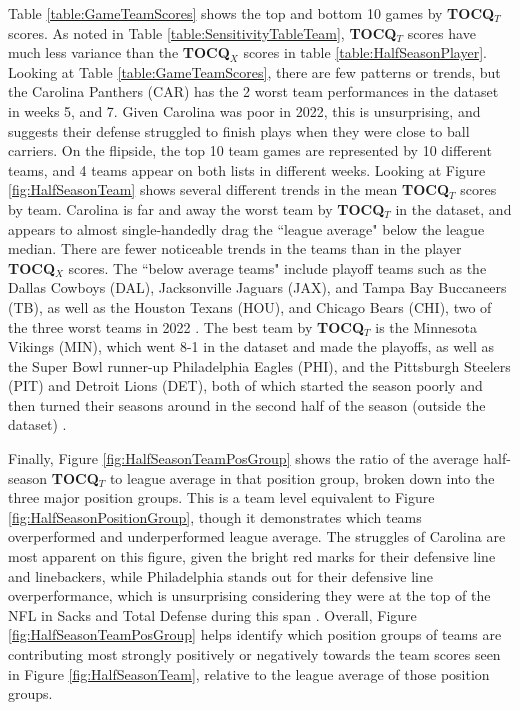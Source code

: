 \documentclass{article}
\begin{document}
Table \ref{table:GameTeamScores} shows the top and bottom 10 games by \textbf{TOCQ$_T$} scores. As noted in Table \ref{table:SensitivityTableTeam}, \textbf{TOCQ$_T$} scores have much less variance than the \textbf{TOCQ$_X$} scores in table \ref{table:HalfSeasonPlayer}. Looking at Table \ref{table:GameTeamScores}, there are few patterns or trends, but the Carolina Panthers (CAR) has the 2 worst team performances in the dataset in weeks 5, and 7. Given Carolina was poor in 2022, this is unsurprising, and suggests their defense struggled to finish plays when they were close to ball carriers. On the flipside, the top 10 team games are represented by 10 different teams, and 4 teams appear on both lists in different weeks. Looking at Figure \ref{fig:HalfSeasonTeam} shows several different trends in the mean \textbf{TOCQ$_T$} scores by team. Carolina is far and away the worst team by \textbf{TOCQ$_T$} in the dataset, and appears to almost single-handedly drag the ``league average" below the league median. There are fewer noticeable trends in the teams than in the player \textbf{TOCQ$_X$} scores. The ``below average teams" include playoff teams such as the Dallas Cowboys (DAL), Jacksonville Jaguars (JAX), and Tampa Bay Buccaneers (TB), as well as the Houston Texans (HOU), and Chicago Bears (CHI), two of the three worst teams in 2022 \cite{Pro_Football_Reference}. The best team by \textbf{TOCQ$_T$} is the Minnesota Vikings (MIN), which went 8-1 in the dataset and made the playoffs, as well as the Super Bowl runner-up Philadelphia Eagles (PHI), and the Pittsburgh Steelers (PIT) and Detroit Lions (DET), both of which started the season poorly and then turned their seasons around in the second half of the season (outside the dataset) \cite{Pro_Football_Reference}.

Finally, Figure \ref{fig:HalfSeasonTeamPosGroup} shows the ratio of the average half-season \textbf{TOCQ$_T$} to league average in that position group, broken down into the three major position groups. This is a team level equivalent to Figure \ref{fig:HalfSeasonPositionGroup}, though it demonstrates which teams overperformed and underperformed league average. The struggles of Carolina are most apparent on this figure, given the bright red marks for their defensive line and linebackers, while Philadelphia stands out for their defensive line overperformance, which is unsurprising considering they were at the top of the NFL in Sacks and Total Defense during this span \cite{Stathead.com}. Overall, Figure \ref{fig:HalfSeasonTeamPosGroup} helps identify which position groups of teams are contributing most strongly positively or negatively towards the team scores seen in Figure \ref{fig:HalfSeasonTeam}, relative to the league average of those position groups.
\end{document}
